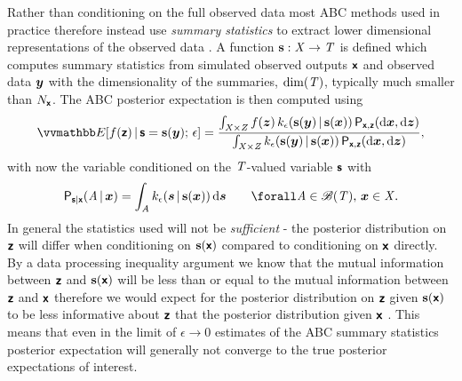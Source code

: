 Rather than conditioning on the full observed data most \ac{ABC} methods used in practice therefore instead use \emph{summary statistics} to extract lower dimensional representations of the observed data \citep{prangle2015summary}. A function ${\mathbf{s}} : \mathit{X} \to \mathit{T}$ is defined which computes summary statistics from simulated observed outputs $\boldsymbol{\mathsf{x}}$ and observed data $\boldsymbol{y}$ with the dimensionality of the summaries, $\dim({\mathit{T}})$, typically much smaller than $N_{\boldsymbol{\mathsf{x}}}$. The \ac{ABC} posterior expectation is then computed using
\begin{equation}
  \label{eq:abc-expectation-summary}
\begin{split}
  \expc{f(\rvct{z}) \gvn \rvct{s} = \vctfunc{s}(\vct{y});\,\epsilon} =
  \frac{
  \int_{\set{X}\times\set{Z}}
    f(\vct{z})\,k_{\epsilon}\lpa\vctfunc{s}(\vct{y})\gvn\vctfunc{s}(\vct{x})\rpa
  \,\prob{\rvct{x},\rvct{z}}(\dr\vct{x},\dr\vct{z})
  }
  {
  \int_{\set{X}\times\set{Z}}
    k_\epsilon\lpa\vctfunc{s}(\vct{y})\gvn\vctfunc{s}(\vct{x})\rpa\,
  \prob{\rvct{x},\rvct{z}}(\dr\vct{x},\dr\vct{z})
  },
\end{split}
\end{equation}
with now the variable conditioned on the $\mathit{T}$-valued variable $\boldsymbol{\mathsf{s}}$ with 
\begin{equation}\label{eq:abc-kernel-summary}
  \prob{\rvct{s}|\rvct{x}}\lpa \set{A} \gvn \vct{x} \rpa = 
  \int_{\set{A}} k_{\epsilon}(\vct{s}\gvn\vctfunc{s}(\vct{x})) \,\dr\vct{s}
  \qquad \forall \set{A} \in \borel(\set{T}),\,\vct{x}\in\set{X}.
\end{equation}
In general the statistics used will not be \emph{sufficient} - the posterior distribution on $\boldsymbol{\mathsf{z}}$ will differ when conditioning on ${\mathbf{s}}(\boldsymbol{\mathsf{x}})$ compared to conditioning on $\boldsymbol{\mathsf{x}}$ directly. By a data processing inequality argument we know that the mutual information between $\boldsymbol{\mathsf{z}}$ and ${\mathbf{s}}(\boldsymbol{\mathsf{x}})$ will be less than or equal to the mutual information between $\boldsymbol{\mathsf{z}}$ and $\boldsymbol{\mathsf{x}}$ therefore we would expect for the posterior distribution on $\boldsymbol{\mathsf{z}}$ given ${\mathbf{s}}(\boldsymbol{\mathsf{x}})$ to be less informative about $\boldsymbol{\mathsf{z}}$ that the posterior distribution given $\boldsymbol{\mathsf{x}}$ \citep{barnes2012considerate}. This means that even in the limit of $\epsilon \to 0$ estimates of the \ac{ABC} summary statistics posterior expectation will generally not converge to the true posterior expectations of interest. 

